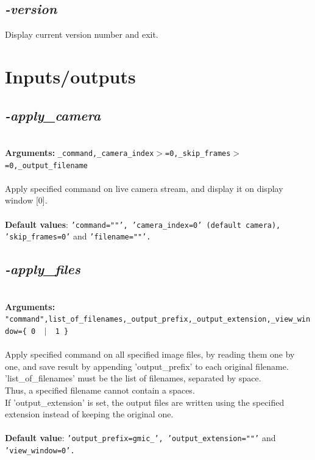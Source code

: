 \documentclass[a4paper,11pt,twoside]{book}
\begin{document}
\subsection{\emph{-version} }\vspace*{-0.5em}
Display current version number and exit.

\section{Inputs/outputs}


\subsection{\emph{-apply\_camera} }\vspace*{-0.5em}
~\\\textbf{Arguments: } 
{\small \texttt{\_command,\_camera\_index$>$=0,\_skip\_frames$>$=0,\_output\_filename}}\\~\\
Apply specified command on live camera stream, and display it on display window [0].
~\\~\\\textbf{Default values}: {\small \texttt{'command=""', 'camera\_index=0' (default camera), 'skip\_frames=0'} and \texttt{'filename=""'.}}


\subsection{\emph{-apply\_files} }\vspace*{-0.5em}
~\\\textbf{Arguments: } 
{\small \texttt{"command",list\_of\_filenames,\_output\_prefix,\_output\_extension,\_view\_window=\{ 0 ~$|$~ 1 \}}}\\~\\
Apply specified command on all specified image files, by reading them one by one,
and save result by appending 'output\_prefix' to each original filename.
~\\'list\_of\_filenames' must be the list of filenames, separated by space.
~\\Thus, a specified filename cannot contain a spaces.
~\\If 'output\_extension' is set, the output files are written using the specified extension instead of keeping
the original one.
~\\~\\\textbf{Default value}: {\small \texttt{'output\_prefix=gmic\_', 'output\_extension=""'} and \texttt{'view\_window=0'.}}
\end{document}
